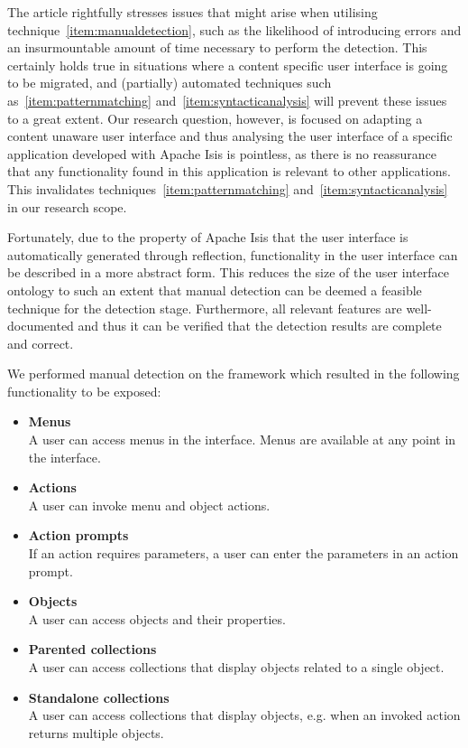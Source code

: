 The article rightfully stresses issues that might arise when utilising technique~\ref{item:manualdetection}, such as the likelihood of introducing errors and an insurmountable amount of time necessary to perform the detection. This certainly holds true in situations where a content specific user interface is going to be migrated, and (partially) automated techniques such as~\ref{item:patternmatching} and~\ref{item:syntacticanalysis} will prevent these issues to a great extent. Our research question, however, is focused on adapting a content unaware user interface and thus analysing the user interface of a specific application developed with Apache Isis is pointless, as there is no reassurance that any functionality found in this application is relevant to other applications. This invalidates techniques~\ref{item:patternmatching} and~\ref{item:syntacticanalysis} in our research scope.

Fortunately, due to the property of Apache Isis that the user interface is automatically generated through reflection, functionality in the user interface can be described in a more abstract form. This reduces the size of the user interface ontology to such an extent that manual detection can be deemed a feasible technique for the detection stage. Furthermore, all relevant features are well-documented\cite{Docum42:online} and thus it can be verified that the detection results are complete and correct.

We performed manual detection on the framework which resulted in the following functionality to be exposed:

\begin{itemize}
	\item 
	\textbf{Menus} \\
	A user can access menus in the interface. Menus are available at any point in the interface.
	
	\item
	\textbf{Actions} \\
	A user can invoke menu and object actions.
	
	\item
	\textbf{Action prompts} \\
	If an action requires parameters, a user can enter the parameters in an action prompt.
	
	\item
	\textbf{Objects} \\
	A user can access objects and their properties.
	
	\item
	\textbf{Parented collections} \\
	A user can access collections that display objects related to a single object.
	
	\item
	\textbf{Standalone collections} \\
	A user can access collections that display objects, e.g. when an invoked action returns multiple objects.
\end{itemize}

